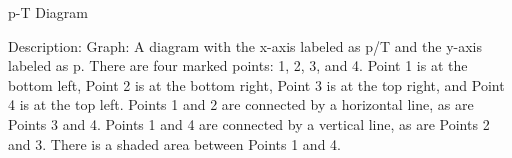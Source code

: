 p-T Diagram

Description:
Graph: A diagram with the x-axis labeled as p/T and the y-axis labeled as p. There are four marked points: 1, 2, 3, and 4. Point 1 is at the bottom left, Point 2 is at the bottom right, Point 3 is at the top right, and Point 4 is at the top left. Points 1 and 2 are connected by a horizontal line, as are Points 3 and 4. Points 1 and 4 are connected by a vertical line, as are Points 2 and 3. There is a shaded area between Points 1 and 4.